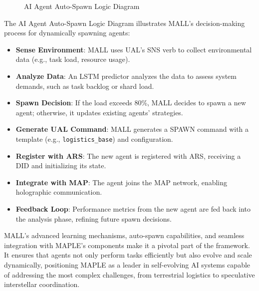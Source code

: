 \documentclass[a4paper,11pt]{article}
\begin{document}
\begin{figure}[!ht]

\caption{AI Agent Auto-Spawn Logic Diagram}
\label{fig:mall-autospawn}
\end{figure}
\vspace{0.5cm}

The AI Agent Auto-Spawn Logic Diagram illustrates MALL’s decision-making process for dynamically spawning agents:
\begin{itemize}[leftmargin=*]
    \item \textbf{Sense Environment}: MALL uses UAL’s SNS verb to collect environmental data (e.g., task load, resource usage).
    \item \textbf{Analyze Data}: An LSTM predictor analyzes the data to assess system demands, such as task backlog or shard load.
    \item \textbf{Spawn Decision}: If the load exceeds 80\%, MALL decides to spawn a new agent; otherwise, it updates existing agents’ strategies.
    \item \textbf{Generate UAL Command}: MALL generates a SPAWN command with a template (e.g., \texttt{logistics\_base}) and configuration.
    \item \textbf{Register with ARS}: The new agent is registered with ARS, receiving a DID and initializing its state.
    \item \textbf{Integrate with MAP}: The agent joins the MAP network, enabling holographic communication.
    \item \textbf{Feedback Loop}: Performance metrics from the new agent are fed back into the analysis phase, refining future spawn decisions.
\end{itemize}

MALL’s advanced learning mechanisms, auto-spawn capabilities, and seamless integration with MAPLE’s components make it a pivotal part of the framework. It ensures that agents not only perform tasks efficiently but also evolve and scale dynamically, positioning MAPLE as a leader in self-evolving AI systems capable of addressing the most complex challenges, from terrestrial logistics to speculative interstellar coordination.
\end{document}
